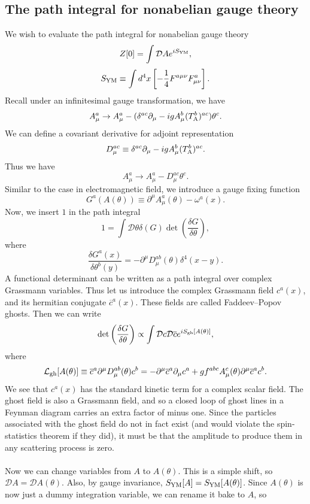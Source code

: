 \subsection{The path integral for nonabelian gauge theory}
We wish to evaluate the path integral for nonabelian gauge theory
\[Z[0] = \int \mathcal{D}A e^{iS_{\rm YM}},\]
\[S_{\rm YM} \equiv \int d^4x \left[-\frac{1}{4}F^{a\mu\nu}F^{a}_{\mu\nu} \right].\]
Recall under an infinitesimal gauge transformation, we have
\[A^{a}_{\mu} \to A^{a}_{\mu} -(\delta^{ac}\partial_{\mu}-igA^{b}_{\mu}(T_{\rm A}^{b})^{ac})\theta^c.\]
We can define a covariant derivative for adjoint representation
\[D_{\mu}^{ac} \equiv \delta^{ac}\partial_{\mu}-igA^{b}_{\mu}(T_{\rm A}^{b})^{ac}.\]
Thus we have
\[A^{a}_{\mu} \to A^{a}_{\mu} - D_{\mu}^{ac}\theta^c.\]
Similar to the case in electromagnetic field, we introduce a gauge fixing function
\[G^a(A(\theta)) \equiv \partial^{\mu}A^a_{\mu}(\theta)  - \omega^a(x).\]
Now, we insert $1$ in the path integral
\[1 = \int \mathcal{D}\theta \delta(G) \det\left( \frac{\delta G}{\delta \theta} \right),\]
where
\[\frac{\delta G^a(x)}{\delta \theta^b(y)} = -\partial^{\mu}D_{\mu}^{ab}(\theta)\delta^4(x-y).\]
A functional determinant can be written as a path integral over complex Grassmann variables. Thus let us introduce the complex Grassmann field $c^a(x)$, and its hermitian conjugate $\overline{c}^a(x)$. These fields are called Faddeev–Popov ghosts. Then we can write
\[ \det\left( \frac{\delta G}{\delta \theta} \right) \propto \int \mathcal{D}c \mathcal{D}\overline{c} e^{iS_{\rm gh}[A(\theta)]},\]
where
\[\mathcal{L}_{\rm gh}[A(\theta)] \equiv \overline{c}^a \partial^{\mu}D^{ab}_{\mu}(\theta)c^b = -\partial^{\mu}\overline{c}^a \partial_{\mu}c^a + gf^{abc}A^c_{\mu}(\theta)\partial^{\mu}\overline{c}^a c^b.\]
We see that $c^a(x)$ has the standard kinetic term for a complex scalar field.  The ghost field is also a Grassmann field, and so a closed loop of ghost lines in a Feynman diagram carries an extra factor of minus one. Since the particles associated with the ghost field do not in fact exist (and would violate the spin-statistics theorem if they did), it must be that the amplitude to produce them in any scattering process is zero.
\\ \\
Now we can change variables from $A$ to $A(\theta)$. This is a simple shift, so $\mathcal{D}A = \mathcal{D}A(\theta)$. Also, by gauge invariance, $S_{\rm YM}[A] = S_{\rm YM}[A(\theta)]$. Since $A(\theta)$ is now just a dummy integration variable, we can rename it bake to $A$, so

